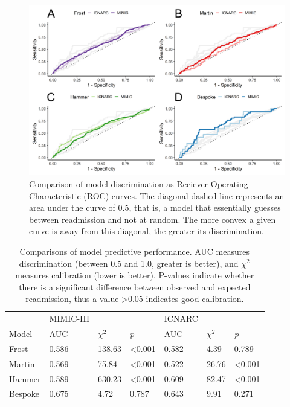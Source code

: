 \documentclass[onecolumn]{article}
\begin{document}
\begin{figure}[t]
\centering
	\includegraphics[width=\textwidth]{discrimination.png}
	\caption{Comparison of model discrimination as Reciever Operating Characteristic (ROC) curves. The diagonal dashed line represents an area under the curve of 0.5, that is, a model that essentially guesses between readmission and not at random. The more convex a given curve is away from this diagonal, the greater its discrimination.}
	\label{DiscriminationFig}
\end{figure}

\begin{table}[h]
\centering
	\renewcommand{\arraystretch}{1.4}
		\caption{Comparisons of model predictive performance. AUC measures discrimination (between 0.5 and 1.0, greater is better), and $\chi^{2}$ measures calibration (lower is better). P-values indicate whether there is a significant difference between observed and expected readmission, thus a value >0.05 indicates good calibration.}
		\begin{tabular}{lllllll}
		\hline
		& MIMIC-III & & & ICNARC & &\\
		Model & AUC & $\chi^{2}$ & \textit{p} & AUC & $\chi^{2}$ & \textit{p}\\
		\hline
		Frost & 0.586 & 138.63 & <0.001 & 0.582 & 4.39 & 0.789\\
		Martin & 0.569 & 75.84 & <0.001 & 0.522 & 26.76 & <0.001\\
		Hammer & 0.589 & 630.23 &  <0.001 & 0.609 & 82.47 & <0.001\\
		Bespoke & 0.675 & 4.72 & 0.787 & 0.643 & 9.91 & 0.271\\
		\hline
		\end{tabular}
	\label{ModelComparisonTable}
\end{table}
\end{document}

